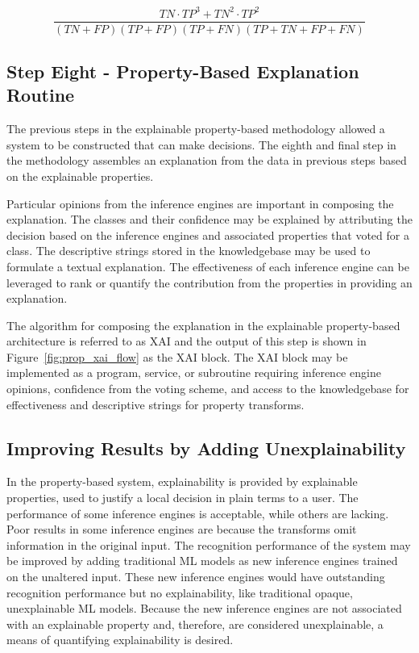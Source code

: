 \begin{equation}\label{eq:epars_expansion}
\frac{TN {\cdot} TP^3+TN^2 {\cdot} TP^2}{(TN{+}FP)(TP{+}FP)(TP{+}FN)(TP{+}TN{+}FP{+}FN)}
\end{equation}

\subsection{Step Eight - Property-Based Explanation Routine} %

The previous steps in the explainable property-based methodology allowed a
system to be constructed that can make decisions. The eighth and final step in
the methodology assembles an explanation from the data in previous steps based
on the explainable properties.

Particular opinions from the inference engines are important in composing the
explanation. The classes and their confidence may be explained by attributing
the decision based on the inference engines and associated properties that voted
for a class. The descriptive strings stored in the knowledgebase may be used to
formulate a textual explanation. The effectiveness of each inference engine can
be leveraged to rank or quantify the contribution from the properties in
providing an explanation.

The algorithm for composing the explanation in the explainable property-based
architecture is referred to as XAI and the output of this step is shown in
Figure~\ref{fig:prop_xai_flow} as the XAI block. The XAI block may be
implemented as a program, service, or subroutine requiring inference engine
opinions, confidence from the voting scheme, and access to the knowledgebase for
effectiveness and descriptive strings for property transforms.

\subsection{Improving Results by Adding Unexplainability}

In the property-based system, explainability is provided by explainable
properties, used to justify a local decision in plain terms to a user. The
performance of some inference engines is acceptable, while others are lacking.
Poor results in some inference engines are because the transforms omit
information in the original input. The recognition performance of the system may
be improved by adding traditional ML models as new inference engines trained on
the unaltered input. These new inference engines would have outstanding
recognition performance but no explainability, like traditional opaque,
unexplainable ML models. Because the new inference engines are not associated
with an explainable property and, therefore, are considered unexplainable, a
means of quantifying explainability is desired.

